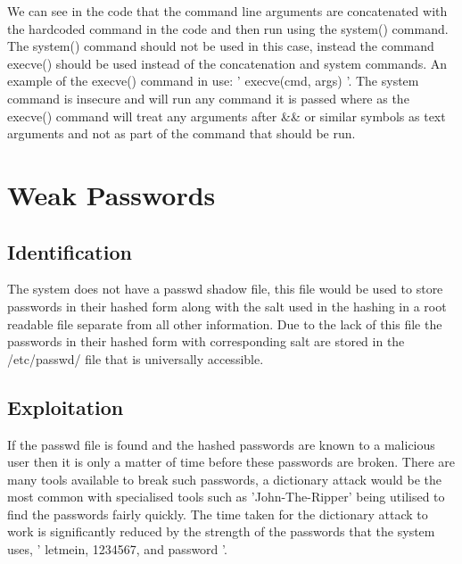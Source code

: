 \documentclass[paper=a4, fontsize=11pt]{scrartcl}
\numberwithin{equation}{section}		%
\numberwithin{figure}{section}			%
\numberwithin{table}{section}				%
\begin{document}

We can see in the code that the command line arguments are concatenated with the hardcoded command in the code and then run using the system() command. The system() command should not be used in this case, instead the command execve() should be used instead of the concatenation and system commands. An example of the execve() command in use: ' execve(cmd, args) '. The system command is insecure and will run any command it is passed where as the execve() command will treat any arguments after \&\& or similar symbols as text arguments and not as part of the command that should be run.

\section*{Weak Passwords}
\subsection*{Identification}


The system does not have a passwd shadow file, this file would be used to store passwords in their hashed form along with the salt used in the hashing in a root readable file separate from all other information. Due to the lack of this file the passwords in their hashed form with corresponding salt are stored in the /etc/passwd/ file that is universally accessible.

\subsection*{Exploitation}


If the passwd file is found and the hashed passwords are known to a malicious user then it is only a matter of time before these passwords are broken. There are many tools available to break such passwords, a dictionary attack would be the most common with specialised tools such as 'John-The-Ripper' being utilised to find the passwords fairly quickly. The time taken for the dictionary attack to work is significantly reduced by the strength of the passwords that the system uses, ' letmein, 1234567, and password '.
\end{document}
